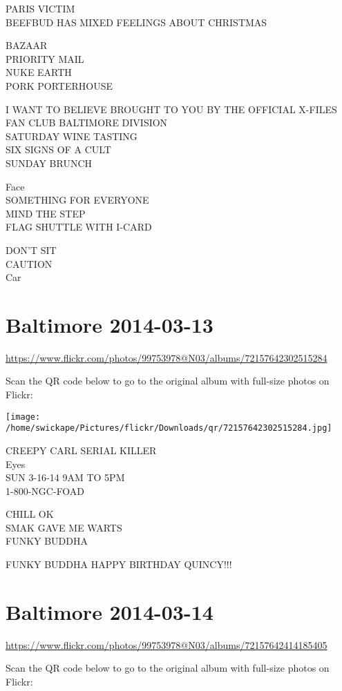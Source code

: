 \documentclass[10pt,letterpaper]{article}
\begin{document}
PARIS VICTIM\\
BEEFBUD HAS MIXED FEELINGS ABOUT CHRISTMAS

BAZAAR\\
PRIORITY MAIL\\
NUKE EARTH\\
PORK PORTERHOUSE

I WANT TO BELIEVE BROUGHT TO YOU BY THE OFFICIAL X{-}FILES FAN CLUB BALTIMORE DIVISION\\
SATURDAY WINE TASTING\\
SIX SIGNS OF A CULT\\
SUNDAY BRUNCH

Face\\
SOMETHING FOR EVERYONE\\
MIND THE STEP\\
FLAG SHUTTLE WITH I{-}CARD

DON'T SIT\\
CAUTION\\
Car


\section*{Baltimore 2014-03-13}

\url{https://www.flickr.com/photos/99753978@N03/albums/72157642302515284}

Scan the QR code below to go to the original album with full-size photos on Flickr:

\texttt{[image: /home/swickape/Pictures/flickr/Downloads/qr/72157642302515284.jpg]}


CREEPY CARL SERIAL KILLER\\
Eyes\\
SUN 3{-}16{-}14 9AM TO 5PM\\
1{-}800{-}NGC{-}FOAD

CHILL OK\\
SMAK GAVE ME WARTS\\
FUNKY BUDDHA

FUNKY BUDDHA HAPPY BIRTHDAY QUINCY!!!


\section*{Baltimore 2014-03-14}

\url{https://www.flickr.com/photos/99753978@N03/albums/72157642414185405}

Scan the QR code below to go to the original album with full-size photos on Flickr:
\end{document}
